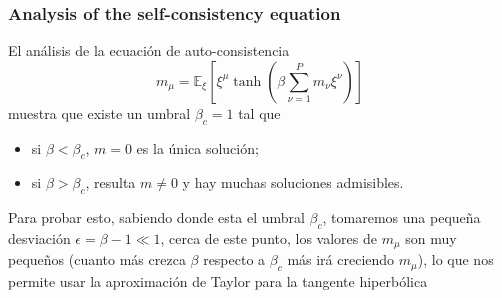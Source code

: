 \subsubsection{Analysis of the self-consistency equation}
\noindent
El análisis de la ecuación de auto-consistencia
\begin{equation*}
    m_{\mu} = \mathbb{E}_{\xi} \left[ \xi^{\mu} \tanh \left( \beta \sum_{\nu=1}^P m_{\nu} \xi^{\nu} \right) \right]
\end{equation*}
muestra que existe un umbral $\beta_c = 1$ tal que
\begin{itemize}
    \item si $\beta < \beta_c$, $m = 0$ es la única solución;
    \item si $\beta > \beta_c$, resulta $m \neq 0$ y hay muchas soluciones admisibles.
\end{itemize}
Para probar esto, sabiendo donde esta el umbral $\beta_c$, tomaremos una pequeña desviación $\epsilon=\beta-1\ll1$, cerca de este punto, los valores de $m_{\mu}$ son muy pequeños (cuanto más crezca $\beta$ respecto a $\beta_c$ más irá creciendo $m_{\mu}$), lo que nos permite usar la aproximación de Taylor para la tangente hiperbólica


